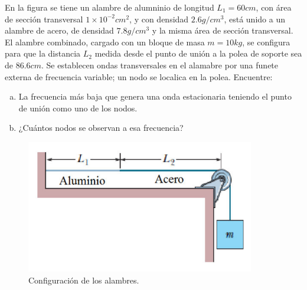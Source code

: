 \begin{mdframed}[style=warning]
	\begin{ejercicio}
		En la figura se tiene un alambre de alumninio de longitud $L_1 = 60cm$, con área de sección transversal $1\times 10^{-2} cm^2$, y con densidad $2.6g/cm^3$, está unido a un alambre de acero, de densidad $7.8g/cm^3$ y la misma área de sección transversal. El alambre combinado, cargado con un bloque de masa $m = 10kg$, se configura para que la distancia $L_2$ medida desde el punto de unión a la polea de soporte sea de $86.6cm$. Se establecen ondas transversales en el alamabre por una funete externa de frecuencia variable; un nodo se localica en la polea. Encuentre:
		\begin{enumerate}[a)]
			\item La frecuencia más baja que genera una onda estacionaria teniendo el punto de unión como uno de los nodos.
			\item ¿Cuántos nodos se observan a esa frecuencia?
		\end{enumerate}
		
		\begin{figure}[H]
			\centering
			\includegraphics[scale=0.4]{./img/alambres.png}
			\caption{\centering Configuración de los alambres.}
			\label{ej4}
		\end{figure}
	\end{ejercicio}
\end{mdframed}









































